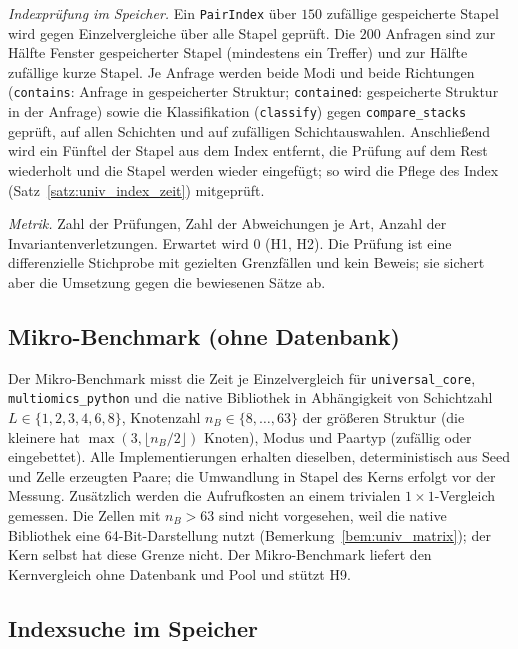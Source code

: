 \documentclass[a4paper,12pt, twoside]{report}
\theoremstyle{definition}
\begin{document}
\emph{Indexprüfung im Speicher.} Ein \texttt{PairIndex} über $150$ zufällige gespeicherte Stapel wird gegen Einzelvergleiche über alle Stapel geprüft. Die $200$ Anfragen sind zur Hälfte Fenster gespeicherter Stapel (mindestens ein Treffer) und zur Hälfte zufällige kurze Stapel. Je Anfrage werden beide Modi und beide Richtungen (\texttt{contains}: Anfrage in gespeicherter Struktur; \texttt{contained}: gespeicherte Struktur in der Anfrage) sowie die Klassifikation (\texttt{classify}) gegen \texttt{compare\_stacks} geprüft, auf allen Schichten und auf zufälligen Schichtauswahlen. Anschließend wird ein Fünftel der Stapel aus dem Index entfernt, die Prüfung auf dem Rest wiederholt und die Stapel werden wieder eingefügt; so wird die Pflege des Index (Satz~\ref{satz:univ_index_zeit}) mitgeprüft.

\emph{Metrik.} Zahl der Prüfungen, Zahl der Abweichungen je Art, Anzahl der Invariantenverletzungen. Erwartet wird $0$ (H1, H2). Die Prüfung ist eine differenzielle Stichprobe mit gezielten Grenzfällen und kein Beweis; sie sichert aber die Umsetzung gegen die bewiesenen Sätze ab.

\subsection{Mikro-Benchmark (ohne Datenbank)}
\label{sec:ucx_micro}

Der Mikro-Benchmark misst die Zeit je Einzelvergleich für \texttt{universal\_core}, \texttt{multiomics\_python} und die native Bibliothek in Abhängigkeit von Schichtzahl $L\in\{1,2,3,4,6,8\}$, Knotenzahl $n_B\in\{8,\dots,63\}$ der größeren Struktur (die kleinere hat $\max(3,\lfloor n_B/2\rfloor)$ Knoten), Modus und Paartyp (zufällig oder eingebettet). Alle Implementierungen erhalten dieselben, deterministisch aus Seed und Zelle erzeugten Paare; die Umwandlung in Stapel des Kerns erfolgt vor der Messung. Zusätzlich werden die Aufrufkosten an einem trivialen $1\times1$-Vergleich gemessen. Die Zellen mit $n_B>63$ sind nicht vorgesehen, weil die native Bibliothek eine 64-Bit-Darstellung nutzt (Bemerkung~\ref{bem:univ_matrix}); der Kern selbst hat diese Grenze nicht. Der Mikro-Benchmark liefert den Kernvergleich ohne Datenbank und Pool und stützt H9.

\subsection{Indexsuche im Speicher}
\label{sec:ucx_memory}
\end{document}
